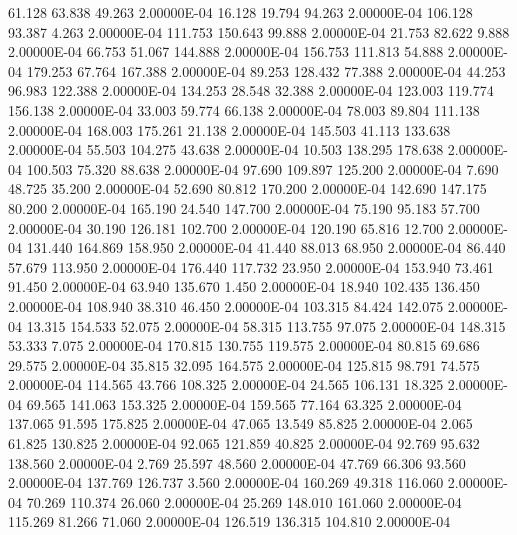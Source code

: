     61.128    63.838    49.263  2.00000E-04
    16.128    19.794    94.263  2.00000E-04
   106.128    93.387     4.263  2.00000E-04
   111.753   150.643    99.888  2.00000E-04
    21.753    82.622     9.888  2.00000E-04
    66.753    51.067   144.888  2.00000E-04
   156.753   111.813    54.888  2.00000E-04
   179.253    67.764   167.388  2.00000E-04
    89.253   128.432    77.388  2.00000E-04
    44.253    96.983   122.388  2.00000E-04
   134.253    28.548    32.388  2.00000E-04
   123.003   119.774   156.138  2.00000E-04
    33.003    59.774    66.138  2.00000E-04
    78.003    89.804   111.138  2.00000E-04
   168.003   175.261    21.138  2.00000E-04
   145.503    41.113   133.638  2.00000E-04
    55.503   104.275    43.638  2.00000E-04
    10.503   138.295   178.638  2.00000E-04
   100.503    75.320    88.638  2.00000E-04
    97.690   109.897   125.200  2.00000E-04
     7.690    48.725    35.200  2.00000E-04
    52.690    80.812   170.200  2.00000E-04
   142.690   147.175    80.200  2.00000E-04
   165.190    24.540   147.700  2.00000E-04
    75.190    95.183    57.700  2.00000E-04
    30.190   126.181   102.700  2.00000E-04
   120.190    65.816    12.700  2.00000E-04
   131.440   164.869   158.950  2.00000E-04
    41.440    88.013    68.950  2.00000E-04
    86.440    57.679   113.950  2.00000E-04
   176.440   117.732    23.950  2.00000E-04
   153.940    73.461    91.450  2.00000E-04
    63.940   135.670     1.450  2.00000E-04
    18.940   102.435   136.450  2.00000E-04
   108.940    38.310    46.450  2.00000E-04
   103.315    84.424   142.075  2.00000E-04
    13.315   154.533    52.075  2.00000E-04
    58.315   113.755    97.075  2.00000E-04
   148.315    53.333     7.075  2.00000E-04
   170.815   130.755   119.575  2.00000E-04
    80.815    69.686    29.575  2.00000E-04
    35.815    32.095   164.575  2.00000E-04
   125.815    98.791    74.575  2.00000E-04
   114.565    43.766   108.325  2.00000E-04
    24.565   106.131    18.325  2.00000E-04
    69.565   141.063   153.325  2.00000E-04
   159.565    77.164    63.325  2.00000E-04
   137.065    91.595   175.825  2.00000E-04
    47.065    13.549    85.825  2.00000E-04
     2.065    61.825   130.825  2.00000E-04
    92.065   121.859    40.825  2.00000E-04
    92.769    95.632   138.560  2.00000E-04
     2.769    25.597    48.560  2.00000E-04
    47.769    66.306    93.560  2.00000E-04
   137.769   126.737     3.560  2.00000E-04
   160.269    49.318   116.060  2.00000E-04
    70.269   110.374    26.060  2.00000E-04
    25.269   148.010   161.060  2.00000E-04
   115.269    81.266    71.060  2.00000E-04
   126.519   136.315   104.810  2.00000E-04
